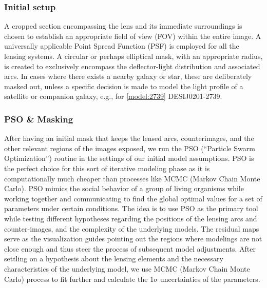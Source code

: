 \documentclass{aa}
\begin{document}
\subsubsection{Initial setup}
A cropped section encompassing the lens and its immediate surroundings is chosen to establish an appropriate field of view (FOV) within the entire image. A universally applicable Point Spread Function (PSF) is employed for all the lensing systems. A circular or perhaps elliptical mask, with an appropriate radius, is created to exclusively encompass the deflector-light distribution and associated arcs. In cases where there exists a nearby galaxy or star, these are deliberately masked out, unless a specific decision is made to model the light profile of a satellite or companion galaxy, e.g., for \ref{model:2739} DESIJ0201-2739.

\subsubsection{PSO \& Masking}
After having an initial mask that keeps the lensed arcs, counterimages, and the other relevant regions of the images exposed, we run the PSO (``Particle Swarm Optimization'') routine in the settings of our initial model assumptions. PSO is the perfect choice for this sort of iterative modeling phase as it is computationally much cheaper than processes like MCMC (Markov Chain Monte Carlo). PSO mimics the social behavior of a group of living organisms while working together and communicating to find the global optimal values for a set of parameters under certain conditions. The idea is to use PSO as the primary tool while testing different hypotheses regarding the positions of the lensing arcs and counter-images, and the complexity of the underlying models. The residual maps serve as the visualization guides pointing out the regions where modelings are not close enough and thus steer the process of subsequent model adjustments.
 After settling on a hypothesis about the lensing elements and the necessary characteristics of the underlying model, we use MCMC (Markov Chain Monte Carlo) process to fit further and calculate the 1$\sigma$ uncertainties of the parameters.
 
\end{document}
